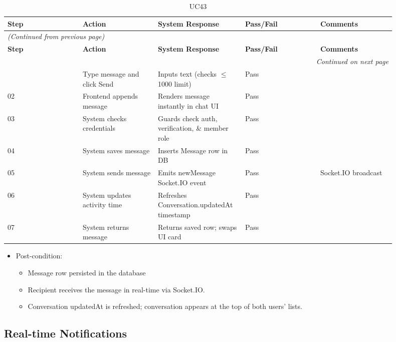 \begin{longtable}{|p{0.18\linewidth}|p{0.18\linewidth}|p{0.18\linewidth}|p{0.18\linewidth}|p{0.18\linewidth}|}
\caption{UC43} \label{tab:40} \\
\hline
\textbf{Step} & \textbf{Action} & \textbf{System Response} & \textbf{Pass/Fail} & \textbf{Comments} \\
\hline
\endfirsthead
\multicolumn{5}{l}{\textit{(Continued from previous page)}} \\
\hline
\textbf{Step} & \textbf{Action} & \textbf{System Response} & \textbf{Pass/Fail} & \textbf{Comments} \\
\hline
\endhead
\hline \multicolumn{5}{r}{\textit{Continued on next page}} \\
\endfoot
\hline
\endlastfoot
01 & Type message and click Send & Inputs text (checks $\leq$ 1000 limit) & Pass &  \\
\hline
02 & Frontend appends message & Renders message instantly in chat UI & Pass &  \\
\hline
03 & System checks credentials & Guards check auth, verification, \& member role & Pass &  \\
\hline
04 & System saves message & Inserts Message row in DB & Pass &  \\
\hline
05 & System sends message & Emits newMessage Socket.IO event & Pass & Socket.IO broadcast \\
\hline
06 & System updates activity time & Refreshes Conversation.updatedAt timestamp & Pass &  \\
\hline
07 & System returns message & Returns saved row; swaps UI card & Pass &  \\
\hline
\end{longtable}

\begin{itemize}
  \item Post-condition:
\begin{itemize}
  \item Message row persisted in the database
  \item Recipient receives the message in real-time via Socket.IO.
  \item Conversation updatedAt is refreshed; conversation appears at the top of both users' lists.
\end{itemize}
\end{itemize}

\subsection{Real-time Notifications}

